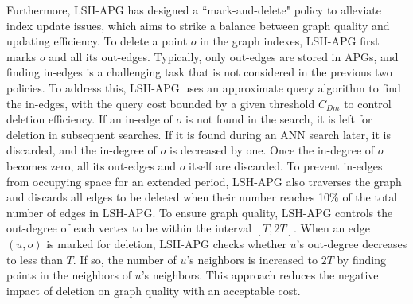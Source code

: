 \documentclass[11pt]{article}
\begin{document}
Furthermore, LSH-APG has designed a ``mark-and-delete" policy to alleviate index update issues, which aims to strike a balance between graph quality and updating efficiency. To delete a point $o$ in the graph indexes, LSH-APG first marks $o$ and all its out-edges. Typically, only out-edges are stored in APGs, and finding in-edges is a challenging task that is not considered in the previous two policies. To address this, LSH-APG uses an approximate query algorithm to find the in-edges, with the query cost bounded by a given threshold $C_{Dm}$ to control deletion efficiency. If an in-edge of $o$ is not found in the search, it is left for deletion in subsequent searches. If it is found during an ANN search later, it is discarded, and the in-degree of $o$ is decreased by one. Once the in-degree of $o$ becomes zero, all its out-edges and $o$ itself are discarded. To prevent in-edges from occupying space for an extended period, LSH-APG also traverses the graph and discards all edges to be deleted when their number reaches 10$\%$ of the total number of edges in LSH-APG. To ensure graph quality, LSH-APG controls the out-degree of each vertex to be within the interval $[T,2T]$. When an edge $(u,o)$ is marked for deletion, LSH-APG checks whether $u$'s out-degree decreases to less than $T$. If so, the number of $u$'s neighbors is increased to $2T$ by finding points in the neighbors of $u$'s neighbors. This approach reduces the negative impact of deletion on graph quality with an acceptable cost.
\end{document}
